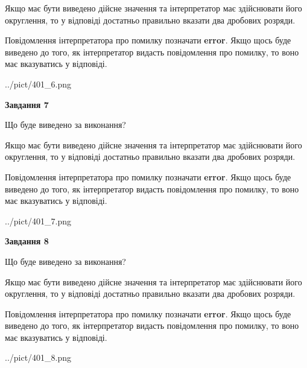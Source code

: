 \documentclass[12pt, ukrainian]{article}
\begin{document}
{\begin {Large}
Якщо має бути виведено дійсне значення та інтерпретатор має здійснювати його округлення, 
то у відповіді достатньо правильно вказати два дробових розряди.

Повідомлення інтерпретатора про помилку позначати \textbf{error}.
Якщо щось буде виведено до того, як інтерпретатор видасть повідомлення про помилку, 
то воно має вказуватись у відповіді. \par

\begin{center}
	{../pict/401_6.png}
\end{center}
\newpage

{\begin {center}\textbf{Завдання 7}\end {center}}\par
Що буде виведено за виконання? \par

Якщо має бути виведено дійсне значення та інтерпретатор має здійснювати його округлення, 
то у відповіді достатньо правильно вказати два дробових розряди.

Повідомлення інтерпретатора про помилку позначати \textbf{error}.
Якщо щось буде виведено до того, як інтерпретатор видасть повідомлення про помилку, 
то воно має вказуватись у відповіді. \par

\begin{center}
	{../pict/401_7.png}
\end{center}
\newpage

{\begin {center}\textbf{Завдання 8}\end {center}}\par
Що буде виведено за виконання? \par

Якщо має бути виведено дійсне значення та інтерпретатор має здійснювати його округлення, 
то у відповіді достатньо правильно вказати два дробових розряди.

Повідомлення інтерпретатора про помилку позначати \textbf{error}.
Якщо щось буде виведено до того, як інтерпретатор видасть повідомлення про помилку, 
то воно має вказуватись у відповіді. \par

\begin{center}
	{../pict/401_8.png}
\end{center}
\newpage


\end{Large}}
\end{document}
